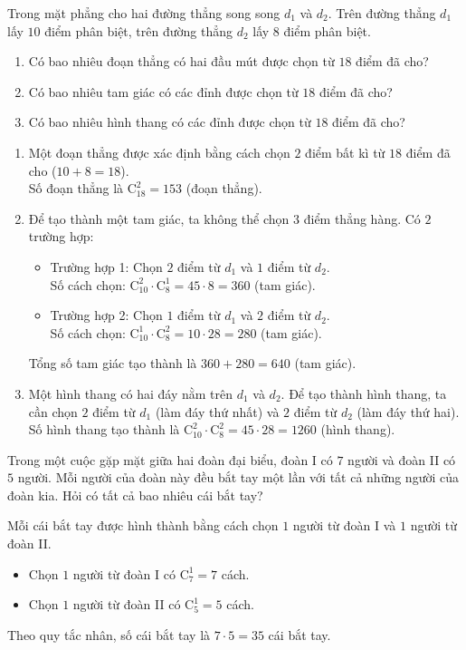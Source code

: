 \begin{ex}%
	Trong mặt phẳng cho hai đường thẳng song song $d_1$ và $d_2$. Trên đường thẳng $d_1$ lấy $10$ điểm phân biệt, trên đường thẳng $d_2$ lấy $8$ điểm phân biệt.
	\begin{enumerate}
		\item Có bao nhiêu đoạn thẳng có hai đầu mút được chọn từ $18$ điểm đã cho?
		\item Có bao nhiêu tam giác có các đỉnh được chọn từ $18$ điểm đã cho?
		\item Có bao nhiêu hình thang có các đỉnh được chọn từ $18$ điểm đã cho?
	\end{enumerate}
	\loigiai
	{
		\begin{enumerate}
			\item Một đoạn thẳng được xác định bằng cách chọn $2$ điểm bất kì từ $18$ điểm đã cho ($10 + 8 = 18$). \\
			Số đoạn thẳng là $\mathrm{C}_{18}^2 = 153$ (đoạn thẳng).		
			\item Để tạo thành một tam giác, ta không thể chọn $3$ điểm thẳng hàng. Có $2$ trường hợp:
			\begin{itemize}
				\item Trường hợp 1: Chọn $2$ điểm từ $d_1$ và $1$ điểm từ $d_2$. \\
				Số cách chọn: $\mathrm{C}_{10}^2 \cdot \mathrm{C}_8^1 = 45 \cdot 8 = 360$ (tam giác).
				\item Trường hợp 2: Chọn $1$ điểm từ $d_1$ và $2$ điểm từ $d_2$. \\
				Số cách chọn: $\mathrm{C}_{10}^1 \cdot \mathrm{C}_8^2 = 10 \cdot 28 = 280$ (tam giác).
			\end{itemize}
			Tổng số tam giác tạo thành là $360 + 280 = 640$ (tam giác).
			
			\item Một hình thang có hai đáy nằm trên $d_1$ và $d_2$. Để tạo thành hình thang, ta cần chọn $2$ điểm từ $d_1$ (làm đáy thứ nhất) và $2$ điểm từ $d_2$ (làm đáy thứ hai). \\
			Số hình thang tạo thành là $\mathrm{C}_{10}^2 \cdot \mathrm{C}_8^2 = 45 \cdot 28 = 1260$ (hình thang).
		\end{enumerate}
	}
\end{ex}
\begin{ex}%
	Trong một cuộc gặp mặt giữa hai đoàn đại biểu, đoàn I có $7$ người và đoàn II có $5$ người. Mỗi người của đoàn này đều bắt tay một lần với tất cả những người của đoàn kia. Hỏi có tất cả bao nhiêu cái bắt tay?
	\loigiai
	{
		Mỗi cái bắt tay được hình thành bằng cách chọn $1$ người từ đoàn I và $1$ người từ đoàn II.
		\begin{itemize}
			\item Chọn $1$ người từ đoàn I có $\mathrm{C}_7^1 = 7$ cách.
			\item Chọn $1$ người từ đoàn II có $\mathrm{C}_5^1 = 5$ cách.
		\end{itemize}
		Theo quy tắc nhân, số cái bắt tay là $7 \cdot  5 = 35$ cái bắt tay.
	}
\end{ex}
